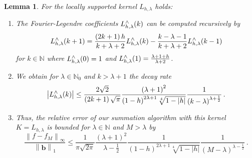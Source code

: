 \documentclass[11pt,a4paper,twoside,bibtotoc]{scrartcl}
\theoremstyle{plain}
\newtheorem{lemma}[theorem]{Lemma}
\theoremstyle{definition}
\theoremstyle{remark}
\newcommand{\N}{\ensuremath{\mathbb{N}}}
\newcommand{\NZ}{\ensuremath{\mathbb{N}_{0}}}
\newcommand{\fun}[2]{\ensuremath{#1{\hspace{-0.4ex}}\left(#2\right)}}
\newcommand{\paren}[1]{\ensuremath{\left(#1\right)}}
\newcommand{\mb}[1]{\mathbf{#1}}
\newcommand{\V}[1]{\mb{#1}}
\numberwithin{equation}{section}
\numberwithin{table}{section}
\numberwithin{figure}{section}
\begin{document}
\begin{lemma}
  For the locally supported kernel $L_{h,\lambda}$ holds:
  \begin{enumerate}
  \item The Fourier-Legendre coefficients $\fun{L_{h,\lambda}^{\wedge}}{k}$ can be computed recursively by
    \[
    \fun{L_{h,\lambda}^{\wedge}}{k+1} = \frac{\paren{2k+1} h}{k+\lambda+2}
    \fun{L_{h,\lambda}^{\wedge}}{k}   - \frac{k-\lambda-1}{k+\lambda+2}
    \fun{L_{h,\lambda}^{\wedge}}{k-1}
    \]
    for $k\in \N$ where $\fun{L_{h,\lambda}^{\wedge}}{0} = 1$ and
    $\fun{L_{h,\lambda}^{\wedge}}{1} = \frac{\lambda + 1 + h}{\lambda+2}$.
  \item We obtain for $\lambda \in \NZ$ and $k>\lambda+1$ the decay rate
    \[
    \left|\fun{L_{h,\lambda}^{\wedge}}{k}\right| \le
    \frac{2\sqrt{2}}{\paren{2k+1}\sqrt{\pi}}
    \frac{\paren{\lambda+1}^2}{\paren{1-h}^{2\lambda+1}\sqrt[4]{1-|h|}}
    \frac{1}{\paren{k-\lambda}^{\lambda+\frac{1}{2}}}\,. 
    \]
  \item Thus, the relative error of our summation algorithm with this kernel
  $K=L_{h,\lambda}$ is bounded for $\lambda \in \N$ and $M>\lambda$ by
  \begin{equation}
    \label{error:Lh}
    \frac{\left\|f - f_{M}\right\|_{\infty}}{\left\|\V{b}\right\|_1} \le
    \frac{1}{\pi\sqrt{2\pi}}
    \frac{\paren{\lambda+1}^2}{\lambda-\frac{1}{2}}
    \frac{1}{\paren{1-h}^{2\lambda+1}\sqrt[4]{1-|h|}}
    \frac{1}{\paren{M-\lambda}^{\lambda-\frac{1}{2}}}\,.
  \end{equation}
  \end{enumerate}
\end{lemma}
\end{document}

